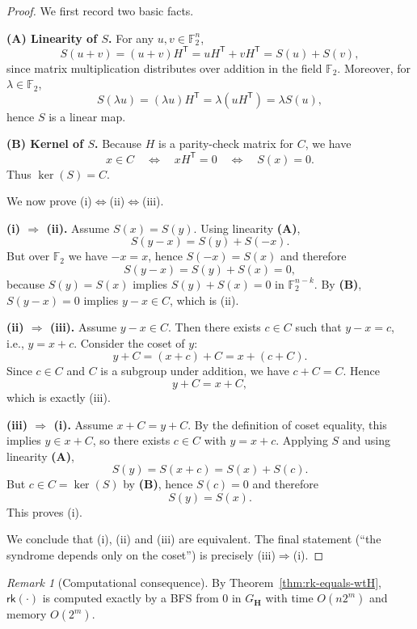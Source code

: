 \documentclass[11pt,twoside,leqno]{article}
\theoremstyle{definition}
\theoremstyle{plain}
\theoremstyle{remark}
\newtheorem{remark}[definition]{Remark}
\newcommand{\rk}{\mathsf{rk}}
\newcommand{\HH}{\mathbf{H}}
\begin{document}
\begin{proof}
We first record two basic facts.

\smallskip
\noindent\textbf{(A) Linearity of $S$.}
For any $u,v\in\mathbb{F}_2^n$,
\[
S(u+v)=(u+v)H^{\mathsf T}=uH^{\mathsf T}+vH^{\mathsf T}=S(u)+S(v),
\]
since matrix multiplication distributes over addition in the field $\mathbb{F}_2$.
Moreover, for $\lambda\in\mathbb{F}_2$,
\[
S(\lambda u)=(\lambda u)H^{\mathsf T}=\lambda(uH^{\mathsf T})=\lambda S(u),
\]
hence $S$ is a linear map.

\smallskip
\noindent\textbf{(B) Kernel of $S$.}
Because $H$ is a parity-check matrix for $C$, we have
\[
x\in C\quad\Longleftrightarrow\quad xH^{\mathsf T}=0
\quad\Longleftrightarrow\quad S(x)=0.
\]
Thus $\ker(S)=C$.

\smallskip
We now prove \textnormal{(i)}$\Leftrightarrow$\textnormal{(ii)}$\Leftrightarrow$\textnormal{(iii)}.

\smallskip
\noindent\textbf{\textnormal{(i)} $\Rightarrow$ \textnormal{(ii)}.}
Assume $S(x)=S(y)$. Using linearity \textbf{(A)},
\[
S(y-x)=S(y)+S(-x).
\]
But over $\mathbb{F}_2$ we have $-x=x$, hence $S(-x)=S(x)$ and therefore
\[
S(y-x)=S(y)+S(x)=0,
\]
because $S(y)=S(x)$ implies $S(y)+S(x)=0$ in $\mathbb{F}_2^{n-k}$.
By \textbf{(B)}, $S(y-x)=0$ implies $y-x\in C$, which is \textnormal{(ii)}.

\smallskip
\noindent\textbf{\textnormal{(ii)} $\Rightarrow$ \textnormal{(iii)}.}
Assume $y-x\in C$. Then there exists $c\in C$ such that $y-x=c$, i.e., $y=x+c$.
Consider the coset of $y$:
\[
y+C=(x+c)+C=x+(c+C).
\]
Since $c\in C$ and $C$ is a subgroup under addition, we have $c+C=C$.
Hence
\[
y+C=x+C,
\]
which is exactly \textnormal{(iii)}.

\smallskip
\noindent\textbf{\textnormal{(iii)} $\Rightarrow$ \textnormal{(i)}.}
Assume $x+C=y+C$. By the definition of coset equality, this implies $y\in x+C$,
so there exists $c\in C$ with $y=x+c$.
Applying $S$ and using linearity \textbf{(A)},
\[
S(y)=S(x+c)=S(x)+S(c).
\]
But $c\in C=\ker(S)$ by \textbf{(B)}, hence $S(c)=0$ and therefore
\[
S(y)=S(x).
\]
This proves \textnormal{(i)}.

\smallskip
We conclude that \textnormal{(i)}, \textnormal{(ii)} and \textnormal{(iii)} are equivalent.
The final statement (“the syndrome depends only on the coset”) is precisely \textnormal{(iii)}$\Rightarrow$\textnormal{(i)}.
\end{proof}

\begin{remark}[Computational consequence]
By Theorem~\ref{thm:rk-equals-wtH}, $\rk(\cdot)$ is computed exactly by a BFS from $0$ in $G_\HH$ with time $O(n2^m)$ and memory $O(2^m)$.
\end{remark}
\end{document}
